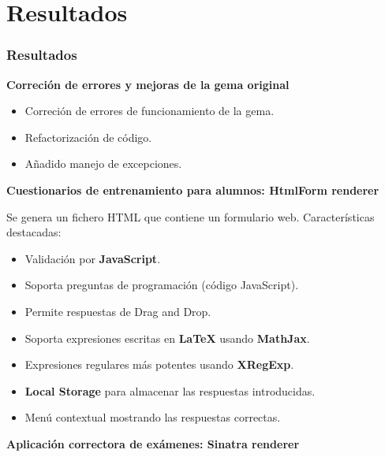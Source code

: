 \documentclass{beamer}
\begin{document}
\section{Resultados}
\begin{frame}[allowframebreaks]
  \frametitle{Resultados}
  
  {\bfseries Correción de errores y mejoras de la gema original}
  \bigskip
  
  \begin{itemize}
    \item Correción de errores de funcionamiento de la gema.
    \item Refactorización de código.
    \item Añadido manejo de excepciones.
  \end{itemize}
  \framebreak
  
  {\bfseries Cuestionarios de entrenamiento para alumnos: HtmlForm renderer}
  \bigskip
  
  Se genera un fichero HTML que contiene un formulario web. Características destacadas:
  \begin{itemize}
    \item Validación por {\bfseries JavaScript}.
    \item Soporta preguntas de programación (código JavaScript).
    \item Permite respuestas de Drag and Drop.
    \item Soporta expresiones escritas en {\bfseries LaTeX} usando {\bfseries MathJax}.
    \item Expresiones regulares más potentes usando {\bfseries XRegExp}.
    \item {\bfseries Local Storage} para almacenar las respuestas introducidas.
    \item Menú contextual mostrando las respuestas correctas.
  \end{itemize}
  \framebreak
  
  {\bfseries Aplicación correctora de exámenes: Sinatra renderer}
  \bigskip
  

\end{frame}
\end{document}
